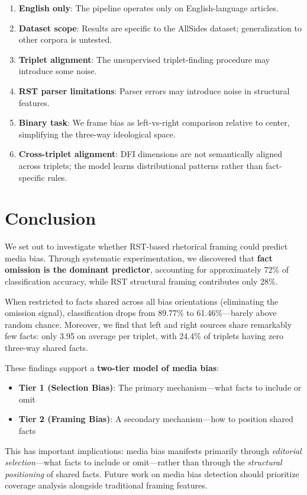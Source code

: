 \documentclass[11pt]{article}
\begin{document}
\begin{enumerate}
    \item \textbf{English only}: The pipeline operates only on English-language articles.
    \item \textbf{Dataset scope}: Results are specific to the AllSides dataset; generalization to other corpora is untested.
    \item \textbf{Triplet alignment}: The unsupervised triplet-finding procedure may introduce some noise.
    \item \textbf{RST parser limitations}: Parser errors may introduce noise in structural features.
    \item \textbf{Binary task}: We frame bias as left-vs-right comparison relative to center, simplifying the three-way ideological space.
    \item \textbf{Cross-triplet alignment}: DFI dimensions are not semantically aligned across triplets; the model learns distributional patterns rather than fact-specific rules.
\end{enumerate}

\section{Conclusion}

We set out to investigate whether RST-based rhetorical framing could predict media bias. Through systematic experimentation, we discovered that \textbf{fact omission is the dominant predictor}, accounting for approximately 72\% of classification accuracy, while RST structural framing contributes only 28\%.

When restricted to facts shared across all bias orientations (eliminating the omission signal), classification drops from 89.77\% to 61.46\%---barely above random chance. Moreover, we find that left and right sources share remarkably few facts: only 3.95 on average per triplet, with 24.4\% of triplets having zero three-way shared facts.

These findings support a \textbf{two-tier model of media bias}:
\begin{itemize}
    \item \textbf{Tier 1 (Selection Bias)}: The primary mechanism---what facts to include or omit
    \item \textbf{Tier 2 (Framing Bias)}: A secondary mechanism---how to position shared facts
\end{itemize}

This has important implications: media bias manifests primarily through \textit{editorial selection}---what facts to include or omit---rather than through the \textit{structural positioning} of shared facts. Future work on media bias detection should prioritize coverage analysis alongside traditional framing features.
\end{document}

